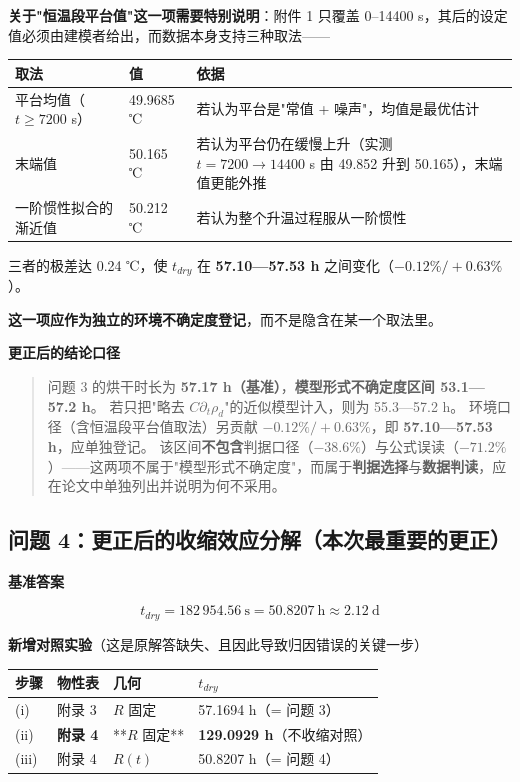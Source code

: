 \textbf{关于"恒温段平台值"这一项需要特别说明}：附件 1 只覆盖 0–14400 s，其后的设定值必须由建模者给出，而数据本身支持三种取法——


\begin{center}
\small
\begin{tabular}{lll}
\toprule
取法 & 值 & 依据 \\
\midrule
平台均值（$t\ge7200$ s） & 49.9685 ℃ & 若认为平台是"常值 + 噪声"，均值是最优估计 \\
末端值 & 50.165 ℃ & 若认为平台仍在缓慢上升（实测 $t=7200\to14400$ s 由 49.852 升到 50.165），末端值更能外推 \\
一阶惯性拟合的渐近值 & 50.212 ℃ & 若认为整个升温过程服从一阶惯性 \\
\bottomrule
\end{tabular}
\end{center}


三者的极差达 0.24 ℃，使 $t_{dry}$ 在 \textbf{57.10—57.53 h} 之间变化（$-0.12\%/+0.63\%$）。

\textbf{这一项应作为独立的环境不确定度登记}，而不是隐含在某一个取法里。



\textbf{更正后的结论口径}


\begin{quote}
问题 3 的烘干时长为 \textbf{57.17 h（基准）}，\textbf{模型形式不确定度区间 53.1—57.2 h}。 若只把"略去 $C\partial_t\rho_d$"的近似模型计入，则为 55.3—57.2 h。 环境口径（含恒温段平台值取法）另贡献 $-0.12\%/+0.63\%$，即 \textbf{57.10—57.53 h}，应单独登记。 该区间\textbf{不包含}判据口径（$-38.6\%$）与公式误读（$-71.2\%$）——这两项不属于"模型形式不确定度"，而属于\textbf{判据选择}与\textbf{数据判读}，应在论文中单独列出并说明为何不采用。
\end{quote}


\subsection{问题 4：\textbf{更正后的收缩效应分解（本次最重要的更正）}}


\textbf{基准答案}


\begin{equation*}
t_{dry}=182\,954.56\ \mathrm s=50.8207\ \mathrm h\approx2.12\ \mathrm d
\end{equation*}


\textbf{新增对照实验}（这是原解答缺失、且因此导致归因错误的关键一步）


\begin{center}
\small
\begin{tabular}{llll}
\toprule
步骤 & 物性表 & 几何 & $t_{dry}$ \\
\midrule
(i) & 附录 3 & $R$ 固定 & 57.1694 h（= 问题 3） \\
(ii) & \textbf{附录 4} & **$R$ 固定** & \textbf{129.0929 h}（不收缩对照） \\
(iii) & 附录 4 & $R(t)$ & 50.8207 h（= 问题 4） \\
\bottomrule
\end{tabular}
\end{center}


